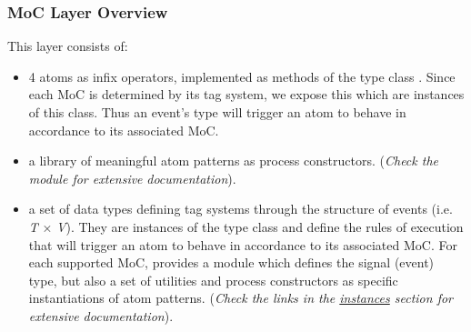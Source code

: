 \subsubsection{MoC Layer Overview}
This layer consists of:\par
\begin{itemize}
\item
4 atoms as infix operators, implemented as methods of the type
 class . Since each MoC is determined by its tag system, we
 expose this 
 which are instances of this class. Thus an event's type will
 trigger an atom to behave in accordance to its associated MoC.\par

\item
a library of meaningful atom patterns as process constructors.
 (\emph{Check the  module for extensive}
 \emph{documentation}).\par

\item
a set of data types defining tag systems through the structure
 of events (i.e. \emph{T} × \emph{V}). They are instances of the 
 type class and define the rules of execution that will trigger an
 atom to behave in accordance to its associated MoC. For each
 supported MoC,  provides a module which defines the
 signal (event) type, but also a set of utilities and process
 constructors as specific instantiations of atom patterns.
 (\emph{Check the links in the \hyperref[section.i:MoC]{instances} section for}
 \emph{extensive documentation}).\par

\end{itemize}

